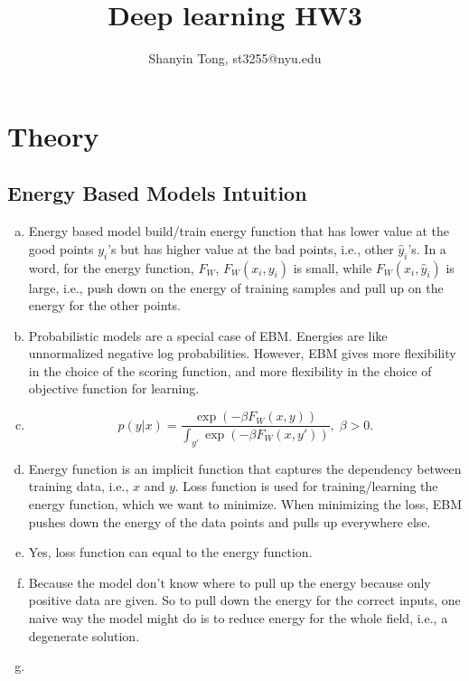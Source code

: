 \documentclass[10pt,a4paper]{article}
\theoremstyle{dotlessP}
\begin{document}
\title{Deep learning HW3}
\author{Shanyin Tong, st3255@nyu.edu}

\maketitle

\section{Theory}

\subsection{Energy Based Models Intuition}
\begin{enumerate}[(a)]
	\item Energy based model build/train energy function that has lower value at the good points $y_i$'s but has higher value at the bad points, i.e., other $\hat{y}_i$'s. In a word, for the energy function, $F_W$, $F_W(x_i, y_i)$ is small, while $F_W(x_i, \hat{y}_i)$ is large, i.e., push down on the energy of training samples and pull up on the energy for the other points.
	\item Probabilistic models are a special case of EBM. Energies are like unnormalized negative log probabilities. However, EBM gives more flexibility in the choice of the scoring function, and more flexibility in the choice of objective function for learning.
	\item \begin{equation}
	p(y|x) =\frac{\exp(-\beta F_W(x,y))}{\int_{y'}\exp(-\beta F_W(x,y'))}, \; \beta >0.
	\end{equation}
	\item Energy function is an implicit function that captures the dependency between training data, i.e., $x$ and $y$. Loss function is used for training/learning the energy function, which we want to minimize. When minimizing the loss, EBM pushes down the energy of the data points and pulls up everywhere else.
	\item Yes, loss function can equal to the energy function.
	\item Because the model don't know where to pull up the energy because only positive data are given. So to pull down the energy for the correct inputs, one naive way the model might do is to reduce energy for the whole field, i.e., a degenerate solution.
	\item \begin{enumerate}[(1)]

\end{enumerate}
\end{enumerate}
\end{document}
